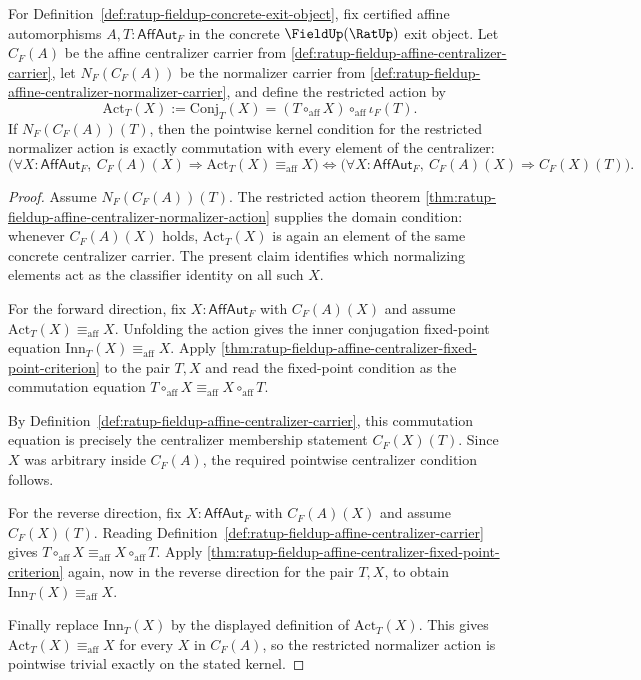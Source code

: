 \begin{theorem}
\label{thm:ratup-fieldup-affine-normalizer-action-kernel}
For Definition~\ref{def:ratup-fieldup-concrete-exit-object}, fix certified
affine automorphisms $A,T:\mathsf{AffAut}_F$ in the concrete
$\FieldUp(\RatUp)$ exit object. Let $C_F(A)$ be the affine centralizer carrier
from \autoref{def:ratup-fieldup-affine-centralizer-carrier}, let
$N_F(C_F(A))$ be the normalizer carrier from
\autoref{def:ratup-fieldup-affine-centralizer-normalizer-carrier}, and define
the restricted action by
$$
\mathrm{Act}_T(X):=\mathrm{Conj}_T(X)
=(T\circ_{\mathrm{aff}}X)\circ_{\mathrm{aff}}\iota_F(T).
$$
If $N_F(C_F(A))(T)$, then the pointwise kernel condition for the restricted
normalizer action is exactly commutation with every element of the centralizer:
$$
\bigl(\forall X:\mathsf{AffAut}_F,\ C_F(A)(X)\Rightarrow
\mathrm{Act}_T(X)\equiv_{\mathrm{aff}}X\bigr)
\Longleftrightarrow
\bigl(\forall X:\mathsf{AffAut}_F,\ C_F(A)(X)\Rightarrow C_F(X)(T)\bigr).
$$
\end{theorem}
\begin{proof}
Assume $N_F(C_F(A))(T)$. The restricted action theorem
\autoref{thm:ratup-fieldup-affine-centralizer-normalizer-action} supplies the
domain condition: whenever $C_F(A)(X)$ holds, $\mathrm{Act}_T(X)$ is again an
element of the same concrete centralizer carrier. The present claim identifies
which normalizing elements act as the classifier identity on all such $X$.

For the forward direction, fix $X:\mathsf{AffAut}_F$ with $C_F(A)(X)$ and assume
$\mathrm{Act}_T(X)\equiv_{\mathrm{aff}}X$. Unfolding the action gives the inner
conjugation fixed-point equation
$\mathrm{Inn}_T(X)\equiv_{\mathrm{aff}}X$. Apply
\autoref{thm:ratup-fieldup-affine-centralizer-fixed-point-criterion} to the pair
$T,X$ and read the fixed-point condition as the commutation equation
$T\circ_{\mathrm{aff}}X\equiv_{\mathrm{aff}}X\circ_{\mathrm{aff}}T$.

By Definition~\ref{def:ratup-fieldup-affine-centralizer-carrier}, this
commutation equation is precisely the centralizer membership statement
$C_F(X)(T)$. Since $X$ was arbitrary inside $C_F(A)$, the required pointwise
centralizer condition follows.

For the reverse direction, fix $X:\mathsf{AffAut}_F$ with $C_F(A)(X)$ and assume
$C_F(X)(T)$. Reading Definition~\ref{def:ratup-fieldup-affine-centralizer-carrier}
gives $T\circ_{\mathrm{aff}}X\equiv_{\mathrm{aff}}X\circ_{\mathrm{aff}}T$.
Apply \autoref{thm:ratup-fieldup-affine-centralizer-fixed-point-criterion} again,
now in the reverse direction for the pair $T,X$, to obtain
$\mathrm{Inn}_T(X)\equiv_{\mathrm{aff}}X$.

Finally replace $\mathrm{Inn}_T(X)$ by the displayed definition of
$\mathrm{Act}_T(X)$. This gives
$\mathrm{Act}_T(X)\equiv_{\mathrm{aff}}X$ for every $X$ in $C_F(A)$, so the
restricted normalizer action is pointwise trivial exactly on the stated kernel.
\end{proof}

